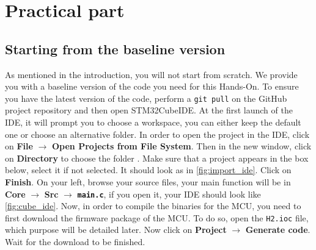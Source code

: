 \section{Practical part}

\subsection{Starting from the baseline version}

As mentioned in the introduction, you will not start from scratch. We provide you with a  baseline version of the code you need for this Hands-On. To ensure you have the latest version of the code, perform a \texttt{git pull} on the GitHub project repository and then open STM32CubeIDE. At the first launch of the IDE, it will prompt you to choose a workspace, you can either keep the default one or choose an alternative folder. In order to open the project in the IDE, click on \textbf{File} $\rightarrow$ \textbf{Open Projects from File System}. Then in the new window, click on \textbf{Directory} to choose the   folder . Make sure that a project appears in the box below, select it if not selected. It should look as in \autoref{fig:import_ide}. Click on \textbf{Finish}. On your left, browse your source files, your main function will be in \textbf{Core} $\rightarrow$ \textbf{Src} $\rightarrow$ \texttt{\textbf{main.c}}, if you open it, your IDE should look like \autoref{fig:cube_ide}. Now, in order to compile the binaries for the MCU, you need to first download the firmware package of the MCU. To do so, open the \texttt{H2.ioc} file, which purpose will be detailed later. Now click on \textbf{Project} $\rightarrow$ \textbf{Generate code}. Wait for the download to be finished.


